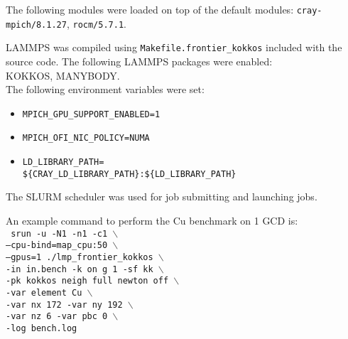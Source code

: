 \documentclass[conference]{IEEEtran}
\begin{document}

The following modules were loaded on top of the default modules: \texttt{cray-mpich/8.1.27}, \texttt{rocm/5.7.1}.

LAMMPS was compiled using \texttt{Makefile.frontier\_kokkos} included with the source code. The following LAMMPS packages were enabled:\\ \phantom{xxx}KOKKOS, MANYBODY.\\
%
The following environment variables were set:
\begin{itemize}
\item \texttt{MPICH\_GPU\_SUPPORT\_ENABLED=1}
\item 
\texttt{MPICH\_OFI\_NIC\_POLICY=NUMA}
\item 
\texttt{LD\_LIBRARY\_PATH= \\
\$\{CRAY\_LD\_LIBRARY\_PATH\}:\$\{LD\_LIBRARY\_PATH\}}
\end{itemize}
The SLURM scheduler was used for job submitting and launching jobs.

\artcomp




An example command to perform the Cu benchmark on 1 GCD is: \\
\texttt{%
\phantom{xxx}srun -u -N1 -n1 -c1 $\backslash$ \\
\phantom{xxxxx}--cpu-bind=map\_cpu:50 $\backslash$ \\
 \phantom{xxxxx}--gpus=1 ./lmp\_frontier\_kokkos $\backslash$ \\
 \phantom{xxxxx}-in in.bench -k on g 1 -sf kk $\backslash$ \\
 \phantom{xxxxx}-pk kokkos neigh full newton off $\backslash$ \\
\phantom{xxxxx}-var element Cu $\backslash$ \\
\phantom{xxxxx}-var nx 172 -var ny 192 $\backslash$ \\
\phantom{xxxxx}-var nz 6 -var pbc 0 $\backslash$ \\
\phantom{xxxxx}-log bench.log
}
\end{document}
